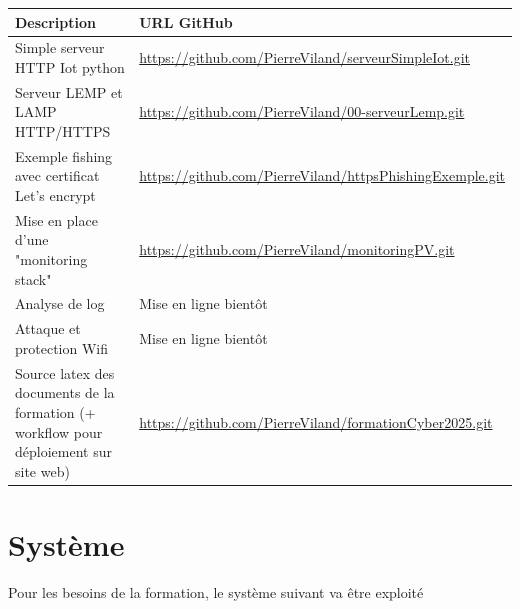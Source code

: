 \documentclass[french, 12pt]{article}%
\begin{document}
\footnotesize
\begin{tabular}{|>{\raggedright\arraybackslash}p{6cm}|>{\raggedright\arraybackslash}p{8cm}|}
\hline
\rowcolor{vert_capet} \textbf{Description} & \textbf{URL GitHub} \\
\hline
Simple serveur HTTP Iot python& \url{https://github.com/PierreViland/serveurSimpleIot.git} \\


\hline
Serveur LEMP et LAMP HTTP/HTTPS& \url{https://github.com/PierreViland/00-serveurLemp.git} \\
\hline
Exemple fishing avec certificat Let's encrypt& \url{https://github.com/PierreViland/httpsPhishingExemple.git} \\
\hline

\hline
Mise en place d'une "monitoring stack" & \url{https://github.com/PierreViland/monitoringPV.git} \\
\hline
\hline
Analyse de log & Mise en ligne bientôt\\
\hline
\hline
Attaque et protection Wifi & Mise en ligne bientôt \\
\hline
\hline
Source latex des documents de la formation (+ workflow pour déploiement sur site web) & \url{https://github.com/PierreViland/formationCyber2025.git} \\
\hline


\end{tabular}

\normalsize


\section{Système}

Pour les besoins de la formation, le système suivant va être exploité  
\end{document}
